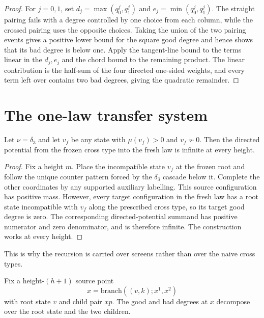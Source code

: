 \begin{proof}
\leanok
{}
For $j=0,1$, set
$d_j=\max(q_0^j,q_1^j)$ and $e_j=\min(q_0^j,q_1^j)$. The straight pairing fails with a degree
controlled by one choice from each column, while the crossed pairing uses the opposite choices.
Taking the union of the two pairing events gives a positive lower bound for the square good
degree and hence shows that its bad degree is below one. Apply the tangent-line bound to the terms
linear in the $d_j,e_j$ and the chord bound to the remaining product. The linear contribution is
the half-sum of the four directed one-sided weights, and every term left over contains two bad
degrees, giving the quadratic remainder.
\end{proof}

\section{The one-law transfer system}

\begin{proposition}
\label{thm:obstruction}
\leanok
{}
Let $\nu=\delta_3$ and let $v_f$ be any state with $\mu(v_f)>0$ and $v_f\not\sim0$. Then the
directed potential from the frozen cross type into the fresh law is infinite at every height.
\end{proposition}

\begin{proof}
\leanok
Fix a height $m$. Place the incompatible state $v_f$ at the frozen root and follow the unique
counter pattern forced by the $\delta_3$ cascade below it. Complete the other coordinates by any
supported auxiliary labelling. This source configuration has positive mass. However, every target
configuration in the fresh law has a root state incompatible with $v_f$ along the prescribed
cross type, so its target good degree is zero. The corresponding directed-potential summand has
positive numerator and zero denominator, and is therefore infinite. The construction works at
every height.
\end{proof}

This is why the recursion is carried over screens rather than over the naive cross types.

\begin{lemma}
\label{thm:one-step}
\leanok
Fix a height-$(h+1)$ source point
\[
 x=\mathrm{branch}((v,k);x^1,x^2)
\]
with root state $v$ and child pair $xp$. The good and bad degrees at $x$ decompose over the root
state and the two children.
\end{lemma}

